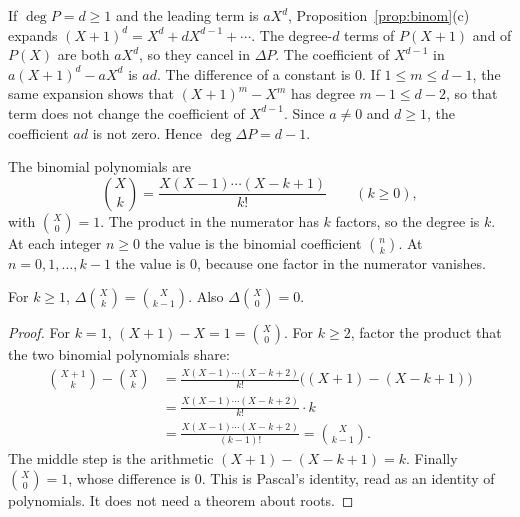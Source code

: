 If $\deg P=d\ge1$ and the leading term is $aX^d$, Proposition~\ref{prop:binom}(c) expands $(X+1)^d=X^d+dX^{d-1}+\cdots$. The degree-$d$ terms of $P(X+1)$ and of $P(X)$ are both $aX^d$, so they cancel in $\Delta P$. The coefficient of $X^{d-1}$ in $a(X+1)^d-aX^d$ is $ad$. The difference of a constant is $0$. If $1\le m\le d-1$, the same expansion shows that $(X+1)^m-X^m$ has degree $m-1\le d-2$, so that term does not change the coefficient of $X^{d-1}$. Since $a\ne0$ and $d\ge1$, the coefficient $ad$ is not zero. Hence $\deg\Delta P=d-1$.

The binomial polynomials are
\[
\binom Xk=\frac{X(X-1)\cdots(X-k+1)}{k!}\qquad(k\ge0),
\]
with $\binom X0=1$. The product in the numerator has $k$ factors, so the degree is $k$. At each integer $n\ge0$ the value is the binomial coefficient $\binom nk$. At $n=0,1,\dots,k-1$ the value is $0$, because one factor in the numerator vanishes.

\begin{proposition}\label{prop:deltabinom}
For $k\ge1$, $\Delta\binom Xk=\binom X{k-1}$. Also $\Delta\binom X0=0$.
\end{proposition}
\begin{proof}
For $k=1$, $(X+1)-X=1=\binom X0$. For $k\ge2$, factor the product that the two binomial polynomials share:
\begin{align*}
\binom{X+1}k-\binom Xk
&=\frac{X(X-1)\cdots(X-k+2)}{k!}\bigl((X+1)-(X-k+1)\bigr)\\
&=\frac{X(X-1)\cdots(X-k+2)}{k!}\cdot k\\
&=\frac{X(X-1)\cdots(X-k+2)}{(k-1)!}
=\binom X{k-1}.
\end{align*}
The middle step is the arithmetic $(X+1)-(X-k+1)=k$. Finally $\binom X0=1$, whose difference is $0$. This is Pascal's identity, read as an identity of polynomials. It does not need a theorem about roots.
\end{proof}

